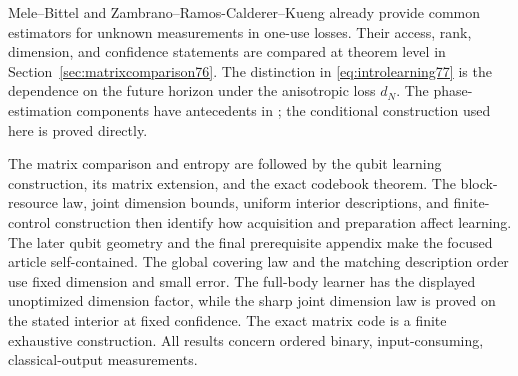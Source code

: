 Mele--Bittel \cite{MB67} and
Zambrano--Ramos-Calderer--Kueng \cite{ZRK76} already provide common
estimators for unknown measurements in one-use losses. Their access,
rank, dimension, and confidence statements are compared at theorem
level in Section~\ref{sec:matrixcomparison76}. The distinction in
\eqref{eq:introlearning77} is the dependence on the future horizon
under the anisotropic loss $d_N$. The phase-estimation components
have antecedents in \cite{HB76,KLY76}; the conditional construction
used here is proved directly.

The matrix comparison and entropy are followed by the qubit learning
construction, its matrix extension, and the exact codebook theorem.
The block-resource law, joint dimension bounds, uniform interior descriptions, and finite-control
construction then identify how acquisition and preparation affect learning. The later qubit geometry and the final prerequisite
appendix make the focused article self-contained. The global covering law and the matching description order use fixed
dimension and small error.  The full-body learner has the displayed
unoptimized dimension factor, while the sharp joint dimension law is
proved on the stated interior at fixed confidence.  The exact matrix
code is a finite exhaustive construction.  All results concern ordered
binary, input-consuming, classical-output measurements.
